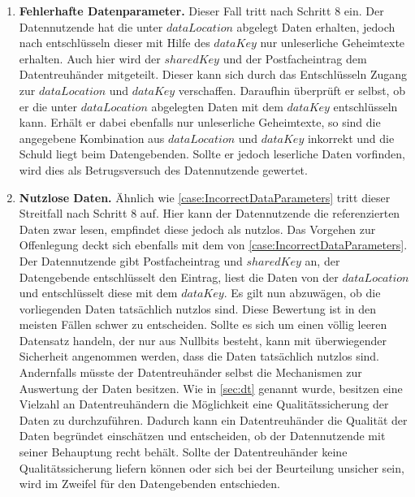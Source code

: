 \documentclass{scrreprt}
\begin{document}
\begin{enumerate}
    
    \item \textbf{Fehlerhafte Datenparameter.}\label{case:IncorrectDataParameters}
    Dieser Fall tritt nach Schritt 8 ein. Der Datennutzende hat die unter $dataLocation$ abgelegt Daten erhalten, jedoch nach entschlüsseln dieser mit Hilfe des $dataKey$ nur unleserliche Geheimtexte erhalten. Auch hier wird der $sharedKey$ und der Postfacheintrag dem Datentreuhänder mitgeteilt. Dieser kann sich durch das Entschlüsseln Zugang zur $dataLocation$ und $dataKey$ verschaffen. Daraufhin überprüft er selbst, ob er die unter $dataLocation$ abgelegten Daten mit dem $dataKey$ entschlüsseln kann. Erhält er dabei ebenfalls nur unleserliche Geheimtexte, so sind die angegebene Kombination aus $dataLocation$ und $dataKey$ inkorrekt und die Schuld liegt beim Datengebenden. Sollte er jedoch leserliche Daten vorfinden, wird dies als Betrugsversuch des Datennutzende gewertet.

    \item \textbf{Nutzlose Daten.}\label{case:UselessData}
    Ähnlich wie \ref{case:IncorrectDataParameters} tritt dieser Streitfall nach Schritt 8 auf. Hier kann der Datennutzende die referenzierten Daten zwar lesen, empfindet diese jedoch als nutzlos. Das Vorgehen zur Offenlegung deckt sich ebenfalls mit dem von \ref{case:IncorrectDataParameters}. Der Datennutzende gibt Postfacheintrag und $sharedKey$ an, der Datengebende entschlüsselt den Eintrag, liest die Daten von der $dataLocation$ und entschlüsselt diese mit dem $dataKey$. Es gilt nun abzuwägen, ob die vorliegenden Daten tatsächlich nutzlos sind. Diese Bewertung ist in den meisten Fällen schwer zu entscheiden. Sollte es sich um einen völlig leeren Datensatz handeln, der nur aus Nullbits besteht, kann mit überwiegender Sicherheit angenommen werden, dass die Daten tatsächlich nutzlos sind. Andernfalls müsste der Datentreuhänder selbst die Mechanismen zur Auswertung der Daten besitzen. Wie in \ref{sec:dt} genannt wurde, besitzen eine Vielzahl an Datentreuhändern die Möglichkeit eine Qualitätssicherung der Daten zu durchzuführen. Dadurch kann ein Datentreuhänder die Qualität der Daten begründet einschätzen und entscheiden, ob der Datennutzende mit seiner Behauptung recht behält. Sollte der Datentreuhänder keine Qualitätssicherung liefern können oder sich bei der Beurteilung unsicher sein, wird im Zweifel für den Datengebenden entschieden.


\end{enumerate}
\end{document}
